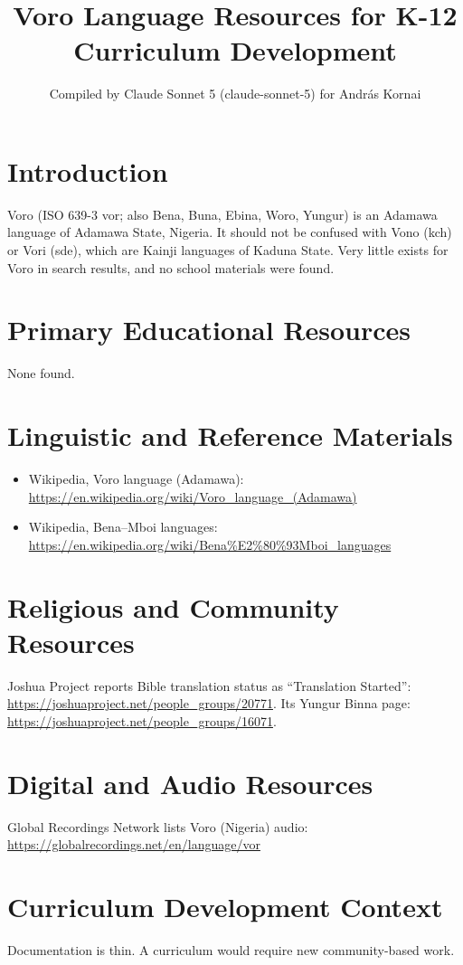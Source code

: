 \documentclass[12pt]{article}
\title{Voro Language Resources for K-12 Curriculum Development}
\author{Compiled by Claude Sonnet 5 (claude-sonnet-5) for Andr\'as Kornai}
\date{}
\begin{document}
\maketitle

\section{Introduction}
Voro (ISO 639-3 vor; also Bena, Buna, Ebina, Woro, Yungur) is an Adamawa language of Adamawa State, Nigeria. It should not be confused with Vono (kch) or Vori (sde), which are Kainji languages of Kaduna State. Very little exists for Voro in search results, and no school materials were found.

\section{Primary Educational Resources}
None found.

\section{Linguistic and Reference Materials}
\begin{itemize}
\item Wikipedia, Voro language (Adamawa): \url{https://en.wikipedia.org/wiki/Voro_language_(Adamawa)}
\item Wikipedia, Bena--Mboi languages: \url{https://en.wikipedia.org/wiki/Bena%E2%80%93Mboi_languages}
\end{itemize}

\section{Religious and Community Resources}
Joshua Project reports Bible translation status as ``Translation Started'':
\url{https://joshuaproject.net/people_groups/20771}. Its Yungur Binna page: \url{https://joshuaproject.net/people_groups/16071}.

\section{Digital and Audio Resources}
Global Recordings Network lists Voro (Nigeria) audio: \url{https://globalrecordings.net/en/language/vor}

\section{Curriculum Development Context}
Documentation is thin. A curriculum would require new community-based work.
\end{document}
